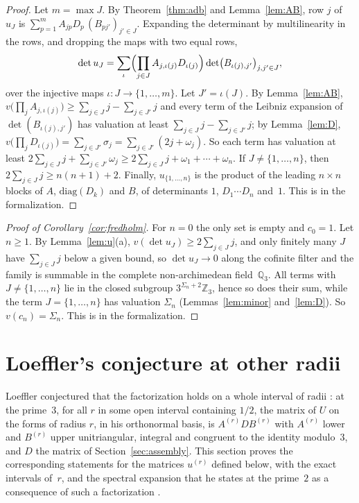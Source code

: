 \documentclass[11pt]{amsart}
\theoremstyle{definition}
\numberwithin{equation}{section}
\newcommand{\Z}{\mathbb{Z}}
\newcommand{\Qp}{\mathbb{Q}_3}
\newcommand{\sig}{\sigma}
\begin{document}
\begin{proof}
Let $m=\max J$. By Theorem~\ref{thm:adb} and Lemma~\ref{lem:AB}, row $j$ of $u_J$ is $\sum_{p=1}^{m}A_{jp}D_p\,(B_{pj'})_{j'\in J}$. Expanding the determinant by multilinearity in the rows, and dropping the maps with two equal rows,
\[
\det u_J=\sum_\iota\Bigl(\prod_{j\in J}A_{j,\iota(j)}D_{\iota(j)}\Bigr)\det\bigl(B_{\iota(j),j'}\bigr)_{j,j'\in J},
\]
over the injective maps $\iota:J\to\{1,\ldots,m\}$. Let $J'=\iota(J)$. By Lemma~\ref{lem:AB}, $v\bigl(\prod_jA_{j,\iota(j)}\bigr)\ge\sum_{j\in J}j-\sum_{j\in J'}j$ and every term of the Leibniz expansion of $\det(B_{\iota(j),j'})$ has valuation at least $\sum_{j\in J}j-\sum_{j\in J'}j$; by Lemma~\ref{lem:D}, $v\bigl(\prod_jD_{\iota(j)}\bigr)=\sum_{j\in J'}\sig_j=\sum_{j\in J'}(2j+\omega_j)$. So each term has valuation at least $2\sum_{j\in J}j+\sum_{j\in J'}\omega_j\ge2\sum_{j\in J}j+\omega_1+\cdots+\omega_n$. If $J\ne\{1,\ldots,n\}$, then $2\sum_{j\in J}j\ge n(n+1)+2$. Finally, $u_{\{1,\ldots,n\}}$ is the product of the leading $n\times n$ blocks of $A$, $\mathrm{diag}(D_k)$ and $B$, of determinants $1$, $D_1\cdots D_n$ and~$1$. This is  in the formalization.
\end{proof}

\begin{proof}[Proof of Corollary~\textup{\ref{cor:fredholm}}]
For $n=0$ the only set is empty and $c_0=1$. Let $n\ge1$. By Lemma~\ref{lem:u}(a), $v(\det u_J)\ge2\sum_{j\in J}j$, and only finitely many $J$ have $\sum_{j\in J}j$ below a given bound, so $\det u_J\to0$ along the cofinite filter and the family is summable in the complete non-archimedean field~$\Qp$. All terms with $J\ne\{1,\ldots,n\}$ lie in the closed subgroup $3^{\Sigma_n+2}\Z_3$, hence so does their sum, while the term $J=\{1,\ldots,n\}$ has valuation $\Sigma_n$ (Lemmas~\ref{lem:minor} and~\ref{lem:D}). So $v(c_n)=\Sigma_n$. This is  in the formalization.
\end{proof}

\section{Loeffler's conjecture at other radii}\label{sec:loeffler}

Loeffler conjectured that the factorization holds on a whole interval of radii \cite[Conjecture~3.1]{Loe07}: at the prime~$3$, for all $r$ in some open interval containing $1/2$, the matrix of $U$ on the forms of radius $r$, in his orthonormal basis, is $A^{(r)}DB^{(r)}$ with $A^{(r)}$ lower and $B^{(r)}$ upper unitriangular, integral and congruent to the identity modulo~$3$, and $D$ the matrix of Section~\ref{sec:assembly}. This section proves the corresponding statements for the matrices $u^{(r)}$ defined below, with the exact intervals of~$r$, and the spectral expansion that he states at the prime~$2$ as a consequence of such a factorization \cite[\S6]{Loe07}.
\end{document}
